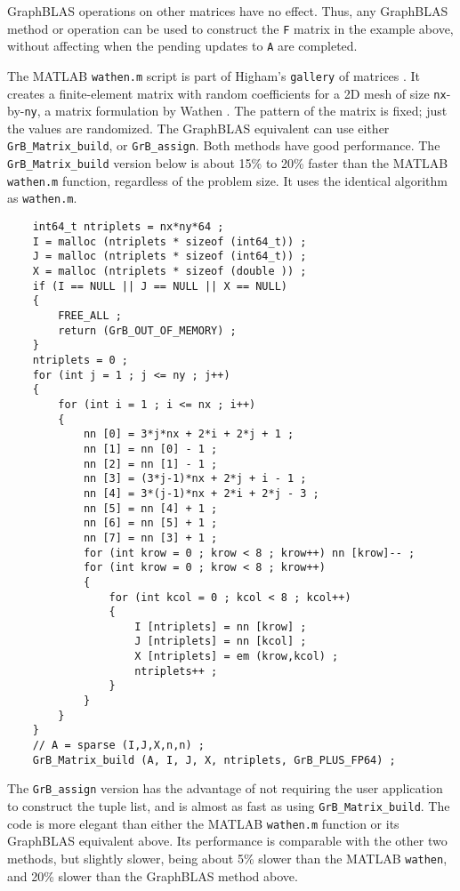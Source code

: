 \documentclass[12pt]{article}
\begin{document}
GraphBLAS operations on other matrices have no effect.  Thus, any GraphBLAS
method or operation can be used to construct the \verb'F' matrix in the example
above, without affecting when the pending updates to \verb'A' are completed.

The MATLAB \verb'wathen.m' script is part of Higham's \verb'gallery' of
matrices \cite{Higham}.  It creates a finite-element matrix with random
coefficients for a 2D mesh of size \verb'nx'-by-\verb'ny', a matrix formulation
by Wathen \cite{Wathen}.  The pattern of the matrix is fixed; just the values
are randomized.  The GraphBLAS equivalent can use either
\verb'GrB_Matrix_build', or \verb'GrB_assign'.  Both methods have good
performance.  The \verb'GrB_Matrix_build' version below is about 15\% to 20\%
faster than the MATLAB \verb'wathen.m' function, regardless of the problem
size.  It uses the identical algorithm as \verb'wathen.m'.

    {\footnotesize
    \begin{verbatim}
    int64_t ntriplets = nx*ny*64 ;
    I = malloc (ntriplets * sizeof (int64_t)) ;
    J = malloc (ntriplets * sizeof (int64_t)) ;
    X = malloc (ntriplets * sizeof (double )) ;
    if (I == NULL || J == NULL || X == NULL)
    {
        FREE_ALL ;
        return (GrB_OUT_OF_MEMORY) ;
    }
    ntriplets = 0 ;
    for (int j = 1 ; j <= ny ; j++)
    {
        for (int i = 1 ; i <= nx ; i++)
        {
            nn [0] = 3*j*nx + 2*i + 2*j + 1 ;
            nn [1] = nn [0] - 1 ;
            nn [2] = nn [1] - 1 ;
            nn [3] = (3*j-1)*nx + 2*j + i - 1 ;
            nn [4] = 3*(j-1)*nx + 2*i + 2*j - 3 ;
            nn [5] = nn [4] + 1 ;
            nn [6] = nn [5] + 1 ;
            nn [7] = nn [3] + 1 ;
            for (int krow = 0 ; krow < 8 ; krow++) nn [krow]-- ;
            for (int krow = 0 ; krow < 8 ; krow++)
            {
                for (int kcol = 0 ; kcol < 8 ; kcol++)
                {
                    I [ntriplets] = nn [krow] ;
                    J [ntriplets] = nn [kcol] ;
                    X [ntriplets] = em (krow,kcol) ;
                    ntriplets++ ;
                }
            }
        }
    }
    // A = sparse (I,J,X,n,n) ;
    GrB_Matrix_build (A, I, J, X, ntriplets, GrB_PLUS_FP64) ; \end{verbatim}}

The \verb'GrB_assign' version has the advantage of not requiring the
user application to construct the tuple list, and is almost as fast as using
\verb'GrB_Matrix_build'.  The code is more elegant than either the MATLAB
\verb'wathen.m' function or its GraphBLAS equivalent above.  Its performance is
comparable with the other two methods, but slightly slower, being about 5\%
slower than the MATLAB \verb'wathen', and 20\% slower than the GraphBLAS
method above.
\end{document}
